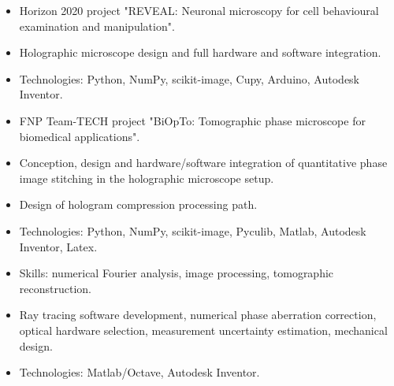 \documentclass[10pt,a4paper,ragged2e,withhyper]{altacv}
\begin{document}
\begin{paracol}{2}


\begin{itemize}
\item Horizon 2020 project "REVEAL: Neuronal microscopy for cell behavioural examination and manipulation".
\item Holographic microscope design and full hardware and software integration.
\item Technologies: Python, NumPy, scikit-image, Cupy, Arduino, Autodesk Inventor.
\end{itemize}

\divider

\begin{itemize}
\item FNP Team-TECH project "BiOpTo: Tomographic phase microscope for biomedical applications".
\item Conception, design and hardware/software integration of quantitative phase image stitching in the holographic microscope setup.
\item Design of hologram compression processing path.
\item Technologies: Python, NumPy, scikit-image, Pyculib, Matlab, Autodesk Inventor, Latex.
\item Skills: numerical Fourier analysis, image processing, tomographic reconstruction.
\end{itemize}

\divider

\begin{itemize}
\item Ray tracing software development, numerical phase aberration correction, optical hardware selection, measurement uncertainty estimation, mechanical design.
\item Technologies: Matlab/Octave, Autodesk Inventor.
\end{itemize}

\divider



\end{paracol}
\end{document}
